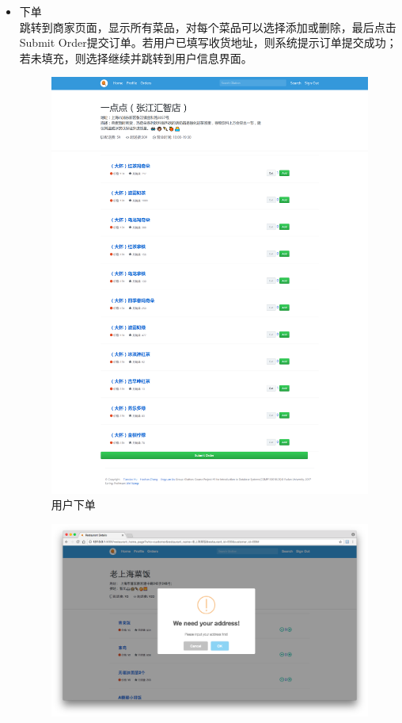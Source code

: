 \documentclass[12pt, oneside,a4paper]{article}
\begin{document}
\begin{itemize}
  \item 下单\\
  跳转到商家页面，显示所有菜品，对每个菜品可以选择添加或删除，最后点击Submit Order提交订单。若用户已填写收货地址，则系统提示订单提交成功；若未填充，则选择继续并跳转到用户信息界面。
  \begin{figure}[H]
   \centering
     \includegraphics[width=6.00in]{cu-dish.png}
     \caption{\small{用户下单}}
  \end{figure}
  \begin{figure}[H]
   \centering
     \includegraphics[width=6.00in]{cu-address.jpg}

\end{figure}
\end{itemize}
\end{document}
